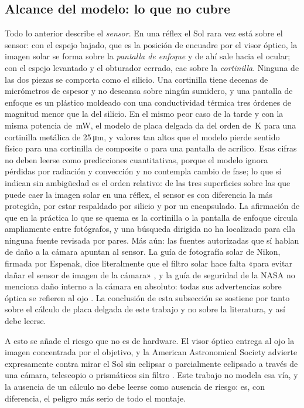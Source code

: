 \documentclass[10pt,a4paper]{article}
\begin{document}
\subsection{Alcance del modelo: lo que no cubre}

Todo lo anterior describe el \emph{sensor}. En una réflex el Sol rara vez está
sobre el sensor: con el espejo bajado, que es la posición de encuadre por el
visor óptico, la imagen solar se forma sobre la \emph{pantalla de enfoque} y de
ahí sale hacia el ocular; con el espejo levantado y el obturador cerrado, cae
sobre la \emph{cortinilla}. Ninguna de las dos piezas se comporta como el
silicio. Una cortinilla tiene decenas de micrómetros de espesor y no descansa
sobre ningún sumidero, y una pantalla de enfoque es un plástico moldeado con una
conductividad térmica tres órdenes de magnitud menor que la del silicio. En el
mismo peor caso de la tarde y con la misma potencia de \PglobThreeZeroZero\,mW,
el modelo de placa delgada da del orden de \dTshutterAl\,K para una cortinilla
metálica de 25\,\si{\micro\meter}, y valores tan altos que el modelo pierde
sentido físico para una cortinilla de composite o para una pantalla de acrílico.
Esas cifras no deben leerse como predicciones cuantitativas, porque el modelo
ignora pérdidas por radiación y convección y no contempla cambio de fase; lo que
sí indican sin ambigüedad es el orden relativo: de las tres superficies sobre las
que puede caer la imagen solar en una réflex, el sensor es con diferencia la más
protegida, por estar respaldado por silicio y por un encapsulado. La afirmación
de que en la práctica lo que se quema es la cortinilla o la pantalla de enfoque
circula ampliamente entre fotógrafos, y una búsqueda dirigida no ha localizado
para ella ninguna fuente revisada por pares. Más aún: las fuentes autorizadas
que sí hablan de daño a la cámara apuntan al sensor. La guía de fotografía solar
de Nikon, firmada por Espenak, dice literalmente que el filtro solar hace falta
«para evitar dañar el sensor de imagen de la cámara» \cite{nikonespenak}, y la
guía de seguridad de la NASA no menciona daño interno a la cámara en absoluto:
todas sus advertencias sobre óptica se refieren al ojo \cite{nasasafety}. La
conclusión de esta subsección se sostiene por tanto sobre el cálculo de placa
delgada de este trabajo y no sobre la literatura, y así debe leerse.

A esto se añade el riesgo que no es de hardware. El visor óptico entrega al ojo
la imagen concentrada por el objetivo, y la American Astronomical Society
advierte expresamente contra mirar el Sol sin eclipsar o parcialmente eclipsado
a través de una cámara, telescopio o prismáticos sin filtro \cite{aas}. Este
trabajo no modela esa vía, y la ausencia de un cálculo no debe leerse como
ausencia de riesgo: es, con diferencia, el peligro más serio de todo el montaje.
\end{document}
